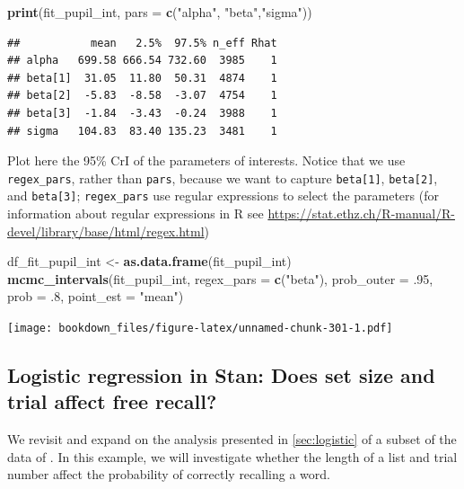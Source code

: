 \documentclass[12pt,]{krantz}
\newenvironment{Shaded}{\begin{snugshade}}{\end{snugshade}}
\newcommand{\KeywordTok}[1]{\textcolor[rgb]{0.13,0.29,0.53}{\textbf{#1}}}
\newcommand{\DataTypeTok}[1]{\textcolor[rgb]{0.13,0.29,0.53}{#1}}
\newcommand{\FloatTok}[1]{\textcolor[rgb]{0.00,0.00,0.81}{#1}}
\newcommand{\StringTok}[1]{\textcolor[rgb]{0.31,0.60,0.02}{#1}}
\newcommand{\NormalTok}[1]{#1}
\theoremstyle{definition}
\theoremstyle{definition}
\theoremstyle{definition}
\theoremstyle{remark}
\begin{document}
\begin{Shaded}
\begin{Highlighting}[]
\KeywordTok{print}\NormalTok{(fit_pupil_int, }\DataTypeTok{pars =} \KeywordTok{c}\NormalTok{(}\StringTok{"alpha"}\NormalTok{, }\StringTok{"beta"}\NormalTok{,}\StringTok{"sigma"}\NormalTok{))}
\end{Highlighting}
\end{Shaded}

\begin{verbatim}
##           mean   2.5%  97.5% n_eff Rhat
## alpha   699.58 666.54 732.60  3985    1
## beta[1]  31.05  11.80  50.31  4874    1
## beta[2]  -5.83  -8.58  -3.07  4754    1
## beta[3]  -1.84  -3.43  -0.24  3988    1
## sigma   104.83  83.40 135.23  3481    1
\end{verbatim}

Plot here the 95\% CrI of the parameters of interests. Notice that we
use \texttt{regex\_pars}, rather than \texttt{pars}, because we want to
capture \texttt{beta{[}1{]}}, \texttt{beta{[}2{]}}, and
\texttt{beta{[}3{]}}; \texttt{regex\_pars} use regular expressions to
select the parameters (for information about regular expressions in R
see
\url{https://stat.ethz.ch/R-manual/R-devel/library/base/html/regex.html})

\begin{Shaded}
\begin{Highlighting}[]
\NormalTok{df_fit_pupil_int <-}\StringTok{ }\KeywordTok{as.data.frame}\NormalTok{(fit_pupil_int)}
\KeywordTok{mcmc_intervals}\NormalTok{(fit_pupil_int,}
               \DataTypeTok{regex_pars =}  \KeywordTok{c}\NormalTok{(}\StringTok{"beta"}\NormalTok{),}
               \DataTypeTok{prob_outer =} \FloatTok{.95}\NormalTok{,}
               \DataTypeTok{prob =} \FloatTok{.8}\NormalTok{,}
               \DataTypeTok{point_est =} \StringTok{"mean"}\NormalTok{)}
\end{Highlighting}
\end{Shaded}

\texttt{[image: bookdown\_files/figure-latex/unnamed-chunk-301-1.pdf]}

\subsection{Logistic regression in Stan: Does set size and trial affect
free recall?}\label{sec:logisticstan}

We revisit and expand on the analysis presented in \ref{sec:logistic} of
a subset of the data of \citet{oberauerWorkingMemoryCapacity2019}. In
this example, we will investigate whether the length of a list and trial
number affect the probability of correctly recalling a word.
\end{document}
